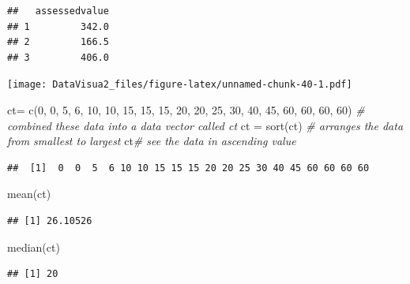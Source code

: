 \documentclass[
]{article}
\newenvironment{Shaded}{\begin{snugshade}}{\end{snugshade}}
\newcommand{\AttributeTok}[1]{\textcolor[rgb]{0.77,0.63,0.00}{#1}}
\newcommand{\CommentTok}[1]{\textcolor[rgb]{0.56,0.35,0.01}{\textit{#1}}}
\newcommand{\DecValTok}[1]{\textcolor[rgb]{0.00,0.00,0.81}{#1}}
\newcommand{\FunctionTok}[1]{\textcolor[rgb]{0.00,0.00,0.00}{#1}}
\newcommand{\NormalTok}[1]{#1}
\newcommand{\OtherTok}[1]{\textcolor[rgb]{0.56,0.35,0.01}{#1}}
\newcommand{\SpecialCharTok}[1]{\textcolor[rgb]{0.00,0.00,0.00}{#1}}
\newcommand{\StringTok}[1]{\textcolor[rgb]{0.31,0.60,0.02}{#1}}
\begin{document}
\begin{verbatim}
##   assessedvalue
## 1         342.0
## 2         166.5
## 3         406.0
\end{verbatim}

\begin{Shaded}
\end{Shaded}

\texttt{[image: DataVisua2\_files/figure-latex/unnamed-chunk-40-1.pdf]}

\begin{Shaded}
\begin{Highlighting}[]
\NormalTok{ct}\OtherTok{=} \FunctionTok{c}\NormalTok{(}\DecValTok{0}\NormalTok{,  }\DecValTok{0}\NormalTok{,  }\DecValTok{5}\NormalTok{,  }\DecValTok{6}\NormalTok{, }\DecValTok{10}\NormalTok{, }\DecValTok{10}\NormalTok{, }\DecValTok{15}\NormalTok{, }\DecValTok{15}\NormalTok{, }\DecValTok{15}\NormalTok{, }\DecValTok{20}\NormalTok{, }\DecValTok{20}\NormalTok{, }\DecValTok{25}\NormalTok{, }\DecValTok{30}\NormalTok{, }\DecValTok{40}\NormalTok{, }\DecValTok{45}\NormalTok{, }\DecValTok{60}\NormalTok{, }\DecValTok{60}\NormalTok{, }\DecValTok{60}\NormalTok{, }\DecValTok{60}\NormalTok{) }\CommentTok{\# combined these data into a data vector called ct}
\NormalTok{ct }\OtherTok{=} \FunctionTok{sort}\NormalTok{(ct)  }\CommentTok{\# arranges the data from smallest to largest}
\NormalTok{ct}\CommentTok{\# see the data in ascending value}
\end{Highlighting}
\end{Shaded}

\begin{verbatim}
##  [1]  0  0  5  6 10 10 15 15 15 20 20 25 30 40 45 60 60 60 60
\end{verbatim}

\begin{Shaded}
\begin{Highlighting}[]
\FunctionTok{mean}\NormalTok{(ct)}
\end{Highlighting}
\end{Shaded}

\begin{verbatim}
## [1] 26.10526
\end{verbatim}

\begin{Shaded}
\begin{Highlighting}[]
\FunctionTok{median}\NormalTok{(ct)}
\end{Highlighting}
\end{Shaded}

\begin{verbatim}
## [1] 20
\end{verbatim}
\end{document}
